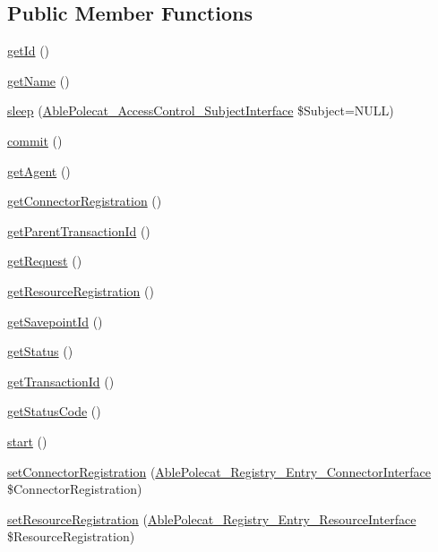 \subsection*{Public Member Functions}
\begin{DoxyCompactItemize}
\item 
\hyperlink{class_able_polecat___transaction_abstract_a12251d0c022e9e21c137a105ff683f13}{get\+Id} ()
\item 
\hyperlink{class_able_polecat___transaction_abstract_a3d0963e68bb313b163a73f2803c64600}{get\+Name} ()
\item 
\hyperlink{class_able_polecat___transaction_abstract_a365e24d7b066205cafa2a5cce3a4f224}{sleep} (\hyperlink{interface_able_polecat___access_control___subject_interface}{Able\+Polecat\+\_\+\+Access\+Control\+\_\+\+Subject\+Interface} \$Subject=N\+U\+L\+L)
\item 
\hyperlink{class_able_polecat___transaction_abstract_af5674c27d4a92f6228565010eacbb9cb}{commit} ()
\item 
\hyperlink{class_able_polecat___transaction_abstract_a14f9546bbf5895db0fe37673bab21850}{get\+Agent} ()
\item 
\hyperlink{class_able_polecat___transaction_abstract_a3e5ea27c16b5306b60f4b105076ca501}{get\+Connector\+Registration} ()
\item 
\hyperlink{class_able_polecat___transaction_abstract_a780c17f0187ec8dba7d8b35b3325d44c}{get\+Parent\+Transaction\+Id} ()
\item 
\hyperlink{class_able_polecat___transaction_abstract_adf1a35ad20e475c59cc0967d5764aa22}{get\+Request} ()
\item 
\hyperlink{class_able_polecat___transaction_abstract_a8876f6810e05036d8c4007394576f53a}{get\+Resource\+Registration} ()
\item 
\hyperlink{class_able_polecat___transaction_abstract_aaaa36c40332d95e879b5072aba995d27}{get\+Savepoint\+Id} ()
\item 
\hyperlink{class_able_polecat___transaction_abstract_a9d21636071f529e2154051d3ea6e5921}{get\+Status} ()
\item 
\hyperlink{class_able_polecat___transaction_abstract_a83a4c2954e4da6dad24e596265e33d0a}{get\+Transaction\+Id} ()
\item 
\hyperlink{class_able_polecat___transaction_abstract_a094778dd1c04fe44626000b47ea0c0bb}{get\+Status\+Code} ()
\item 
\hyperlink{class_able_polecat___transaction_abstract_af8fa59992209e36dccb3eefb0f75531f}{start} ()
\item 
\hyperlink{class_able_polecat___transaction_abstract_abce3a3bf05e38ad71908836e5f375c77}{set\+Connector\+Registration} (\hyperlink{interface_able_polecat___registry___entry___connector_interface}{Able\+Polecat\+\_\+\+Registry\+\_\+\+Entry\+\_\+\+Connector\+Interface} \$Connector\+Registration)
\item 
\hyperlink{class_able_polecat___transaction_abstract_a680215f1ce274c4c73a9f7008e5da7e7}{set\+Resource\+Registration} (\hyperlink{interface_able_polecat___registry___entry___resource_interface}{Able\+Polecat\+\_\+\+Registry\+\_\+\+Entry\+\_\+\+Resource\+Interface} \$Resource\+Registration)
\end{DoxyCompactItemize}

